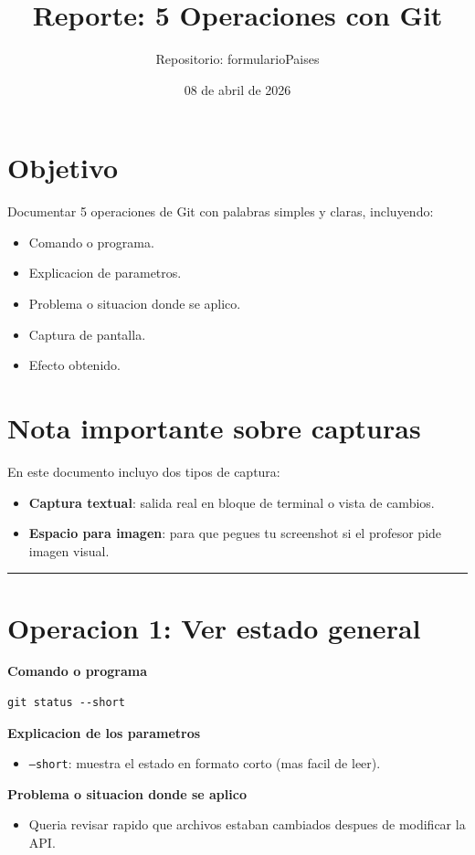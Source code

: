 \documentclass[12pt,a4paper]{article}
\title{Reporte: 5 Operaciones con Git}
\author{Repositorio: formularioPaises}
\date{08 de abril de 2026}
\begin{document}
\maketitle

\section*{Objetivo}
Documentar 5 operaciones de Git con palabras simples y claras, incluyendo:
\begin{itemize}[leftmargin=*]
\item Comando o programa.
\item Explicacion de parametros.
\item Problema o situacion donde se aplico.
\item Captura de pantalla.
\item Efecto obtenido.
\end{itemize}

\section*{Nota importante sobre capturas}
En este documento incluyo dos tipos de captura:
\begin{itemize}[leftmargin=*]
\item \textbf{Captura textual}: salida real en bloque de terminal o vista de cambios.
\item \textbf{Espacio para imagen}: para que pegues tu screenshot si el profesor pide imagen visual.
\end{itemize}

\hrule
\vspace{0.4cm}

\section*{Operacion 1: Ver estado general}
\textbf{Comando o programa}
\begin{Verbatim}[fontsize=\small,frame=single]
git status --short
\end{Verbatim}

\textbf{Explicacion de los parametros}
\begin{itemize}[leftmargin=*]
\item \texttt{--short}: muestra el estado en formato corto (mas facil de leer).
\end{itemize}

\textbf{Problema o situacion donde se aplico}
\begin{itemize}[leftmargin=*]
\item Queria revisar rapido que archivos estaban cambiados despues de modificar la API.
\end{itemize}
\end{document}
